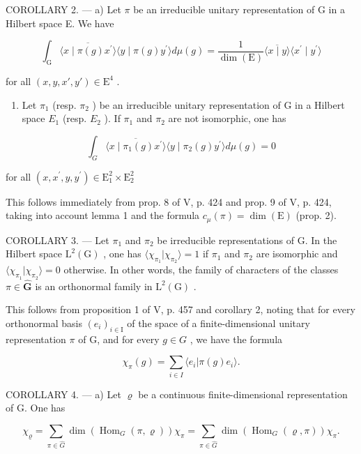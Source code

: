COROLLARY 2. --- a) Let \(\pi\) be an irreducible unitary representation of G in a Hilbert space E. We have

\[
\int_ {\mathrm{G}} \overline {{\langle x \mid \pi (g) x ^ {\prime} \rangle}} \langle y \mid \pi (g) y ^ {\prime} \rangle d \mu (g) = \frac {1}{\dim (\mathrm{E})} \overline {{\langle x \mid y \rangle}} \langle x ^ {\prime} \mid y ^ {\prime} \rangle
\]

for all \((x,y,x',y')\in \mathrm{E}^4\) .

\begin{enumerate}
\def\labelenumi{\alph{enumi})}
\setcounter{enumi}{1}
\tightlist
\item
  Let \(\pi_{1}\) (resp. \(\pi_{2}\) ) be an irreducible unitary representation of G in a Hilbert space \(E_{1}\) (resp. \(E_{2}\) ). If \(\pi_{1}\) and \(\pi_{2}\) are not isomorphic, one has
\end{enumerate}

\[
\int_ {G} \overline {{\langle x \mid \pi_ {1} (g) x ^ {\prime} \rangle}} \langle y \mid \pi_ {2} (g) y ^ {\prime} \rangle d \mu (g) = 0
\]

for all \((x,x^{\prime},y,y^{\prime})\in \mathrm{E}_{1}^{2}\times \mathrm{E}_{2}^{2}\)

This follows immediately from prop. 8 of V, p. 424 and prop. 9 of V, p. 424, taking into account lemma 1 and the formula \(c_{\mu}(\pi) = \dim(\mathrm{E})\) (prop. 2).

COROLLARY 3. --- Let \(\pi_1\) and \(\pi_2\) be irreducible representations of G. In the Hilbert space \(\mathrm{L}^{2}(\mathrm{G})\) , one has \(\langle \chi_{\pi_1} | \chi_{\pi_2} \rangle = 1\) if \(\pi_1\) and \(\pi_2\) are isomorphic and \(\langle \chi_{\pi_1} | \chi_{\pi_2} \rangle = 0\) otherwise. In other words, the family of characters of the classes \(\pi \in \widehat{\mathbf{G}}\) is an orthonormal family in \(\mathrm{L}^{2}(\mathrm{G})\) .

This follows from proposition 1 of V, p. 457 and corollary 2, noting that for every orthonormal basis \((e_{i})_{i\in\mathrm{I}}\) of the space of a finite-dimensional unitary representation \(\pi\) of G, and for every \(g\in G\) , we have the formula

\[
\chi_ {\pi} (g) = \sum_ {i \in I} \langle e _ {i} | \pi (g) e _ {i} \rangle .
\]

COROLLARY 4. --- a) Let \(\varrho\) be a continuous finite-dimensional representation of G. One has

\[
\chi_ {\varrho} = \sum_ {\pi \in \widehat {G}} \dim (\operatorname{Hom} _ {G} (\pi , \varrho)) \chi_ {\pi} = \sum_ {\pi \in \widehat {G}} \dim (\operatorname{Hom} _ {G} (\varrho , \pi)) \chi_ {\pi}.
\]

